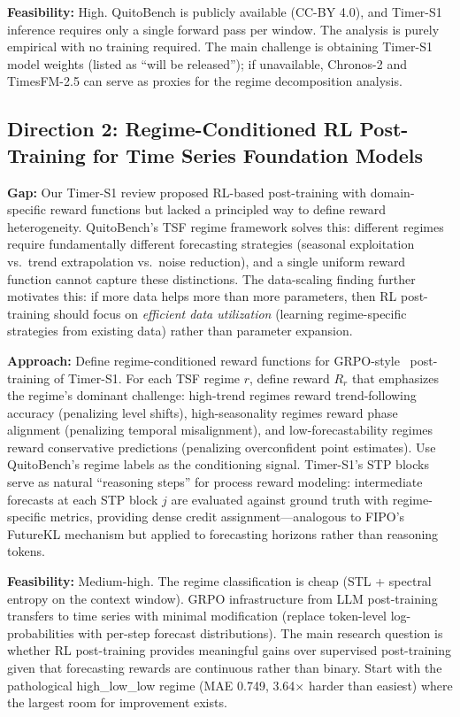 \documentclass[11pt]{article}
\begin{document}
\textbf{Feasibility:} High. QuitoBench is publicly available (CC-BY 4.0), and Timer-S1 inference requires only a single forward pass per window. The analysis is purely empirical with no training required. The main challenge is obtaining Timer-S1 model weights (listed as ``will be released''); if unavailable, Chronos-2 and TimesFM-2.5 can serve as proxies for the regime decomposition analysis.

\subsection{Direction 2: Regime-Conditioned RL Post-Training for Time Series Foundation Models}

\textbf{Gap:} Our Timer-S1 review proposed RL-based post-training with domain-specific reward functions but lacked a principled way to define reward heterogeneity. QuitoBench's TSF regime framework solves this: different regimes require fundamentally different forecasting strategies (seasonal exploitation vs.\ trend extrapolation vs.\ noise reduction), and a single uniform reward function cannot capture these distinctions. The data-scaling finding further motivates this: if more data helps more than more parameters, then RL post-training should focus on \textit{efficient data utilization} (learning regime-specific strategies from existing data) rather than parameter expansion.

\textbf{Approach:} Define regime-conditioned reward functions for GRPO-style~\cite{grpo} post-training of Timer-S1. For each TSF regime $r$, define reward $R_r$ that emphasizes the regime's dominant challenge: high-trend regimes reward trend-following accuracy (penalizing level shifts), high-seasonality regimes reward phase alignment (penalizing temporal misalignment), and low-forecastability regimes reward conservative predictions (penalizing overconfident point estimates). Use QuitoBench's regime labels as the conditioning signal. Timer-S1's STP blocks serve as natural ``reasoning steps'' for process reward modeling: intermediate forecasts at each STP block $j$ are evaluated against ground truth with regime-specific metrics, providing dense credit assignment---analogous to FIPO's~\cite{fipo} FutureKL mechanism but applied to forecasting horizons rather than reasoning tokens.

\textbf{Feasibility:} Medium-high. The regime classification is cheap (STL + spectral entropy on the context window). GRPO infrastructure from LLM post-training transfers to time series with minimal modification (replace token-level log-probabilities with per-step forecast distributions). The main research question is whether RL post-training provides meaningful gains over supervised post-training given that forecasting rewards are continuous rather than binary. Start with the pathological high\_low\_low regime (MAE 0.749, 3.64$\times$ harder than easiest) where the largest room for improvement exists.
\end{document}
